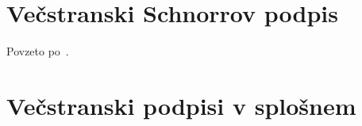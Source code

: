 \documentclass[isrm2, tisk]{fmfdelo}
\begin{document}
\section{Večstranski Schnorrov podpis}
Povzeto po~\cite{micali2001asm}.

\section{Večstranski podpisi v splošnem}

%
%
%
\end{document}
